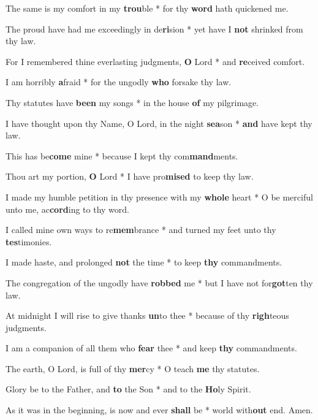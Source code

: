 \begin{multicols}{2}
		The same is my comfort in my \textbf{trou}ble * for thy \textbf{word} hath quickened me.
		
		The proud have had me exceedingly in de\textbf{ri}sion * yet have I \textbf{not} shrinked from thy law.
		
		For I remembered thine everlasting judgments, \textbf{O} Lord * and \textbf{re}ceived comfort.
		
		I am horribly \textbf{a}fraid * for the ungodly \textbf{who} forsake thy law.
		
		Thy statutes have \textbf{been} my songs * in the house \textbf{of} my pilgrimage.
		
		I have thought upon thy Name, O Lord, in the night \textbf{sea}son * \textbf{and} have kept thy law.
		
		This has be\textbf{come} mine * because I kept thy com\textbf{mand}ments.
		
		Thou art my portion, \textbf{O} Lord * I have pro\textbf{mised} to keep thy law.
		
		I made my humble petition in thy presence with my \textbf{whole} heart * O be merciful unto me, ac\textbf{cord}ing to thy word.
		
		I called mine own ways to re\textbf{mem}brance * and turned my feet unto thy \textbf{tes}timonies.
		
		I made haste, and prolonged \textbf{not} the time * to keep \textbf{thy} commandments.
		
		The congregation of the ungodly have \textbf{robbed} me * but I have not for\textbf{got}ten thy law.
		
		At midnight I will rise to give thanks \textbf{un}to thee * because of thy \textbf{righ}teous judgments.
		
		I am a companion of all them who \textbf{fear} thee * and keep \textbf{thy} commandments.
		
		The earth, O Lord, is full of thy \textbf{mer}cy * O teach \textbf{me} thy statutes.
		
		Glory be to the Father, and \textbf{to} the Son * and to the \textbf{Ho}ly Spirit.
		
		As it was in the beginning, is now and ever \textbf{shall} be * world with\textbf{out} end. Amen.
\end{multicols}